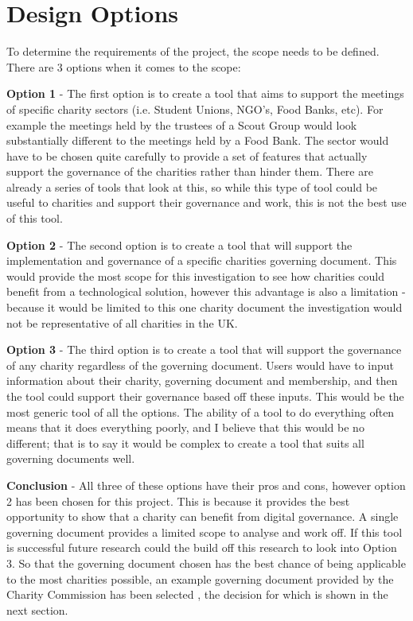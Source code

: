 \documentclass{UoYCSproject}
\begin{document}
\section{Design Options}
To determine the requirements of the project, the scope needs to be defined. There are 3 options when it comes to the scope:

\textbf{Option 1} - The first option is to create a tool that aims to support the meetings of specific charity sectors (i.e. Student Unions, NGO's, Food Banks, etc). For example the meetings held by the trustees of a Scout Group would look substantially different to the meetings held by a Food Bank. The sector would have to be chosen quite carefully to provide a set of features that actually support the governance of the charities rather than hinder them. There are already a series of tools that look at this, so while this type of tool could be useful to charities and support their governance and work, this is not the best use of this tool. 

\textbf{Option 2} - The second option is to create a tool that will support the implementation and governance of a specific charities governing document. This would provide the most scope for this investigation to see how charities could benefit from a technological solution, however this advantage is also a limitation - because it would be limited to this one charity document the investigation would not be representative of all charities in the UK.

\textbf{Option 3} - The third option is to create a tool that will support the governance of any charity regardless of the governing document. Users would have to input information about their charity, governing document and membership, and then the tool could support their governance based off these inputs. This would be the most generic tool of all the options. The ability of a tool to do everything often means that it does everything poorly, and I believe that this would be no different; that is to say it would be complex to create a tool that suits all governing documents well.

\textbf{Conclusion} - All three of these options have their pros and cons, however option 2 has been chosen for this project. This is because it provides the best opportunity to show that a charity can benefit from digital governance. A single governing document provides a limited scope to analyse and work off. If this tool is successful future research could the build off this research to look into Option 3. So that the governing document chosen has the best chance of being applicable to the most charities possible, an example governing document provided by the Charity Commission has been selected \cite{gov_uk_example_trustee_docs}, the decision for which is shown in the next section.
\end{document}
